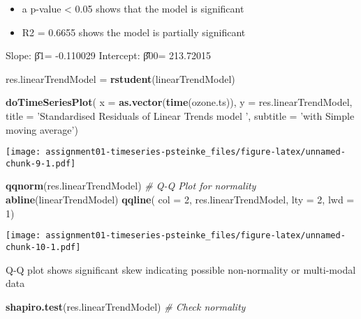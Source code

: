 \documentclass[]{article}
\newenvironment{Shaded}{\begin{snugshade}}{\end{snugshade}}
\newcommand{\CommentTok}[1]{\textcolor[rgb]{0.56,0.35,0.01}{\textit{#1}}}
\newcommand{\DataTypeTok}[1]{\textcolor[rgb]{0.13,0.29,0.53}{#1}}
\newcommand{\DecValTok}[1]{\textcolor[rgb]{0.00,0.00,0.81}{#1}}
\newcommand{\KeywordTok}[1]{\textcolor[rgb]{0.13,0.29,0.53}{\textbf{#1}}}
\newcommand{\NormalTok}[1]{#1}
\newcommand{\StringTok}[1]{\textcolor[rgb]{0.31,0.60,0.02}{#1}}
\providecommand{\tightlist}{%
  \setlength{\itemsep}{0pt}\setlength{\parskip}{0pt}}
\begin{document}
\begin{itemize}
\tightlist
\item
  a p-value \textless{} 0.05 shows that the model is significant
\item
  R2 = 0.6655 shows the model is partially significant
\end{itemize}

Slope: β̂1= -0.110029 Intercept: β̂̂00= 213.72015

\begin{Shaded}
\begin{Highlighting}[]
\NormalTok{res.linearTrendModel =}\StringTok{ }\KeywordTok{rstudent}\NormalTok{(linearTrendModel)}

\KeywordTok{doTimeSeriesPlot}\NormalTok{(}
  \DataTypeTok{x =} \KeywordTok{as.vector}\NormalTok{(}\KeywordTok{time}\NormalTok{(ozone.ts)),}
  \DataTypeTok{y =}\NormalTok{ res.linearTrendModel,}
  \DataTypeTok{title =} \StringTok{'Standardised Residuals of Linear Trends model '}\NormalTok{,}
  \DataTypeTok{subtitle =} \StringTok{'with Simple moving average'}\NormalTok{)}
\end{Highlighting}
\end{Shaded}

\texttt{[image: assignment01-timeseries-psteinke\_files/figure-latex/unnamed-chunk-9-1.pdf]}

\begin{Shaded}
\begin{Highlighting}[]
\KeywordTok{qqnorm}\NormalTok{(res.linearTrendModel) }\CommentTok{# Q-Q Plot for normality}
\KeywordTok{abline}\NormalTok{(linearTrendModel)}
\KeywordTok{qqline}\NormalTok{(}
  \DataTypeTok{col =} \DecValTok{2}\NormalTok{,}
\NormalTok{  res.linearTrendModel,}
  \DataTypeTok{lty =} \DecValTok{2}\NormalTok{,}
  \DataTypeTok{lwd =} \DecValTok{1}\NormalTok{)}
\end{Highlighting}
\end{Shaded}

\texttt{[image: assignment01-timeseries-psteinke\_files/figure-latex/unnamed-chunk-10-1.pdf]}

Q-Q plot shows significant skew indicating possible non-normality or
multi-modal data

\begin{Shaded}
\begin{Highlighting}[]
\KeywordTok{shapiro.test}\NormalTok{(res.linearTrendModel) }\CommentTok{# Check normality}
\end{Highlighting}
\end{Shaded}
\end{document}

